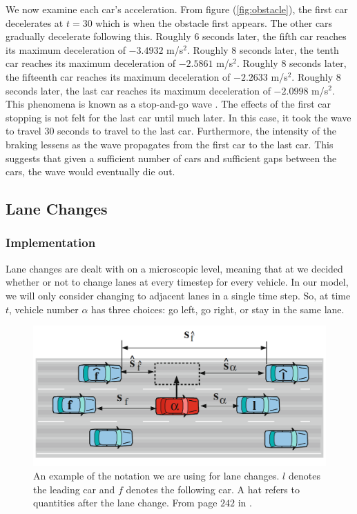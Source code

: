 \documentclass[12pt]{article}
\begin{document}
    We now examine each car's acceleration. From figure (\ref{fig:obstacle}), the first car decelerates at $t=30$ which is when the obstacle first appears. The other cars gradually decelerate following this. Roughly $6$ seconds later, the fifth car reaches its maximum deceleration of $-3.4932$ m/s$^2$. Roughly $8$ seconds later, the tenth car reaches its maximum deceleration of $-2.5861$ m/s$^2$. Roughly $8$ seconds later, the fifteenth car reaches its maximum deceleration of $-2.2633$ m/s$^2$. Roughly $8$ seconds later, the last car reaches its maximum deceleration of $-2.0998$ m/s$^2$. This phenomena is known as a stop-and-go wave \cite{traffic}. The effects of the first car stopping is not felt for the last car until much later. In this case, it took the wave to travel $30$ seconds to travel to the last car. Furthermore, the intensity of the braking lessens as the wave propagates from the first car to the last car. This suggests that given a sufficient number of cars and sufficient gaps between the cars, the wave would eventually die out. 
    \subsection{Lane Changes}
    \subsubsection{Implementation}\label{sec:laneChangeImplementation}

   Lane changes are dealt with on a microscopic level, meaning that at we decided whether or not to change lanes at every timestep for every vehicle.  In our model, we will only consider changing to adjacent lanes in a single time step. So, at time $t$, vehicle number $\alpha$ has three choices: go left, go right, or stay in the same lane.

      \begin{figure}[H]
        \begin{center}
          \includegraphics{lane_change_diagram.PNG}
        \end{center}
        \caption{An example of the notation we are using for lane changes. $l$ denotes the leading car and $f$ denotes the following car. A hat refers to quantities after the lane change. From page $242$ in \cite{traffic}.}
      \end{figure}
\end{document}
